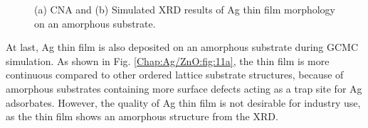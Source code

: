 \newpage
\begingroup
\begin{figure}[!ht]
  \centering
  \label{Chap:Ag/ZnO:fig:11a}
  \label{Chap:Ag/ZnO:fig:11b}
\caption[CNA and Simulated XRD results of Ag thin film morphology on an amorphous substrate.]{(a) \ac{CNA} and (b) Simulated \ac{XRD} results of Ag thin film morphology on an amorphous substrate.}
\label{Chap:Ag/ZnO:fig11}
\end{figure}
\endgroup

At last, Ag thin film is also deposited on an amorphous substrate during \ac{GCMC} simulation. As shown in Fig. \ref{Chap:Ag/ZnO:fig:11a}, the thin film is more continuous compared to other ordered lattice substrate structures, because of amorphous substrates containing more surface defects acting as a trap site for Ag adsorbates. However, the quality of Ag thin film is not desirable for industry use, as the thin film shows an amorphous structure from the \ac{XRD}.